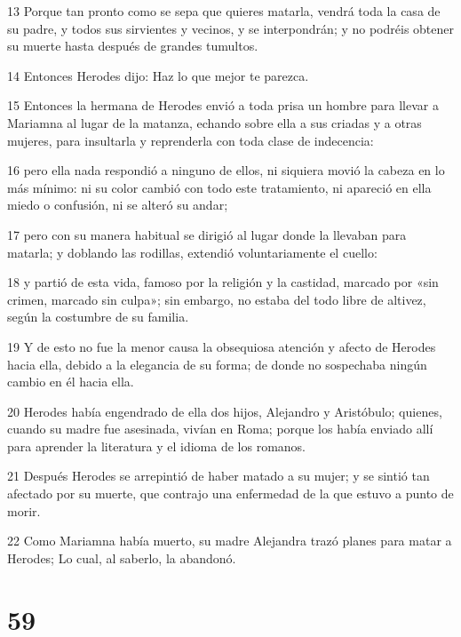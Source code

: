 \par 13 Porque tan pronto como se sepa que quieres matarla, vendrá toda la casa de su padre, y todos sus sirvientes y vecinos, y se interpondrán; y no podréis obtener su muerte hasta después de grandes tumultos.

\par 14 Entonces Herodes dijo: Haz lo que mejor te parezca.

\par 15 Entonces la hermana de Herodes envió a toda prisa un hombre para llevar a Mariamna al lugar de la matanza, echando sobre ella a sus criadas y a otras mujeres, para insultarla y reprenderla con toda clase de indecencia:

\par 16 pero ella nada respondió a ninguno de ellos, ni siquiera movió la cabeza en lo más mínimo: ni su color cambió con todo este tratamiento, ni apareció en ella miedo o confusión, ni se alteró su andar;

\par 17 pero con su manera habitual se dirigió al lugar donde la llevaban para matarla; y doblando las rodillas, extendió voluntariamente el cuello:

\par 18 y partió de esta vida, famoso por la religión y la castidad, marcado por «sin crimen, marcado sin culpa»; sin embargo, no estaba del todo libre de altivez, según la costumbre de su familia.

\par 19 Y de esto no fue la menor causa la obsequiosa atención y afecto de Herodes hacia ella, debido a la elegancia de su forma; de donde no sospechaba ningún cambio en él hacia ella.

\par 20 Herodes había engendrado de ella dos hijos, Alejandro y Aristóbulo; quienes, cuando su madre fue asesinada, vivían en Roma; porque los había enviado allí para aprender la literatura y el idioma de los romanos.

\par 21 Después Herodes se arrepintió de haber matado a su mujer; y se sintió tan afectado por su muerte, que contrajo una enfermedad de la que estuvo a punto de morir.

\par 22 Como Mariamna había muerto, su madre Alejandra trazó planes para matar a Herodes; Lo cual, al saberlo, la abandonó.

\chapter{59}

